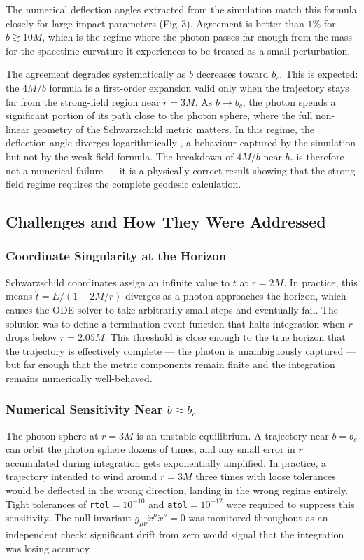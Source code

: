 \documentclass[12pt,a4paper]{article}
\begin{document}
The numerical deflection angles extracted from the simulation match this formula
closely for large impact parameters (Fig.\,3). Agreement is better than $1\%$
for $b \gtrsim 10M$, which is the regime where the photon passes far enough
from the mass for the spacetime curvature it experiences to be treated as a small
perturbation.

The agreement degrades systematically as $b$ decreases toward $b_c$. This is
expected: the $4M/b$ formula is a first-order expansion valid only when the
trajectory stays far from the strong-field region near $r = 3M$. As $b \to b_c$,
the photon spends a significant portion of its path close to the photon sphere,
where the full non-linear geometry of the Schwarzschild metric matters. In this
regime, the deflection angle diverges logarithmically \citep{Darwin1959}, a
behaviour captured by the simulation but not by the weak-field formula.
The breakdown of $4M/b$ near $b_c$ is therefore not a numerical failure — it is
a physically correct result showing that the strong-field regime requires the
complete geodesic calculation.

\subsection{Challenges and How They Were Addressed}

\subsubsection{Coordinate Singularity at the Horizon}
Schwarzschild coordinates assign an infinite value to $t$ at $r = 2M$. In
practice, this means $\dot{t} = E/(1 - 2M/r)$ diverges as a photon approaches
the horizon, which causes the ODE solver to take arbitrarily small steps and
eventually fail. The solution was to define a termination event function that
halts integration when $r$ drops below $r = 2.05M$. This threshold is close
enough to the true horizon that the trajectory is effectively complete — the
photon is unambiguously captured — but far enough that the metric components
remain finite and the integration remains numerically well-behaved.

\subsubsection{Numerical Sensitivity Near $b \approx b_c$}
The photon sphere at $r = 3M$ is an unstable equilibrium. A trajectory near
$b = b_c$ can orbit the photon sphere dozens of times, and any small error in
$r$ accumulated during integration gets exponentially amplified. In practice,
a trajectory intended to wind around $r = 3M$ three times with loose tolerances
would be deflected in the wrong direction, landing in the wrong regime entirely.
Tight tolerances of \texttt{rtol}$= 10^{-10}$ and \texttt{atol}$= 10^{-12}$
were required to suppress this sensitivity. The null invariant
$g_{\mu\nu}\dot{x}^\mu\dot{x}^\nu = 0$ was monitored throughout as an
independent check: significant drift from zero would signal that the integration
was losing accuracy.
\end{document}
